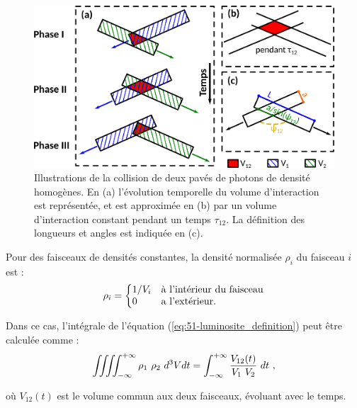 \begin{refsection}
\begin{figure}[hbtp]
	\centering
	\includegraphics[width=\linewidth]{5-opti_theorique/collision_faisceaux.png}
	\caption{Illustrations de la collision de deux pavés de photons de densité homogènes. En (a) l'évolution temporelle du volume d'interaction est représentée, et est approximée en (b) par un volume d'interaction constant pendant un temps $\tau_{12}$. La définition des longueurs et angles est indiquée en (c).}
	\label{fig:52-luminosite_collisions}
\end{figure}

Pour des faisceaux de densités constantes, la densité normalisée $\rho_i$ du faisceau $i$ est :
\begin{equation}
    \rho_i =\left\{\begin{array}{@{}ll@{}} 1/V_i & \text{à l'intérieur du faisceau} \\0 & \text{a l'extérieur.}\end{array}\right.
\end{equation}

Dans ce cas, l'intégrale de l'équation (\ref{eq:51-luminosite_definition}) peut être calculée comme :
\begin{equation}
    \iiiint_{-\infty}^{+\infty} \rho_1 ~ \rho_2 ~ d^3 V dt= \int_{-\infty}^{+\infty}\dfrac{V_{12}(t)}{V_1 ~ V_2} ~ dt~ \rm ,
\end{equation}

où $V_{12}(t)$ est le volume commun aux deux faisceaux, évoluant avec le temps. 



\end{refsection}
